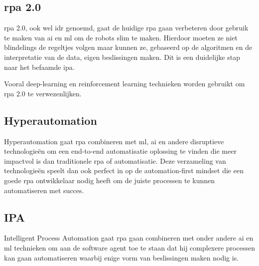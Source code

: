 \subsection{\acrshort{rpa} 2.0}
\acrshort{rpa} 2.0, ook wel \acrfull{idr} genoemd, gaat de huidige \acrshort{rpa} gaan verbeteren door gebruik te maken van  \acrshort{ai} en  \acrshort{ml} om de robots slim te maken. Hierdoor moeten ze niet blindelings de regeltjes volgen maar kunnen ze, gebaseerd op de algoritmen en de interpretatie van de data, eigen beslissingen maken. Dit is een duidelijke stap naar het befaamde  \acrshort{ipa}. \autocite{idrRPA}

Vooral deep-learning en reinforcement learning technieken worden gebruikt om \acrshort{rpa} 2.0 te verwezenlijken. \autocite{idrRPA}

\subsection{Hyperautomation}
Hyperautomation gaat \acrshort{rpa} combineren met  \acrshort{ml},  \acrshort{ai} en andere disruptieve technologieën om een end-to-end automatisatie oplossing te vinden die meer impactvol is dan traditionele \acrshort{rpa} of automatisatie. Deze verzameling van technologieën speelt dan ook perfect in op de automation-first mindset die een goede \acrshort{rpa} ontwikkelaar nodig heeft om de juiste processen te kunnen automatiseren met succes. \autocite{hyperautomation}

\subsection{IPA}
Intelligent Process Automation gaat \acrshort{rpa} gaan combineren met onder andere  \acrshort{ai} en  \acrshort{ml} technieken om aan de software agent toe te staan dat hij complexere processen kan gaan automatiseren waarbij enige vorm van beslissingen maken nodig is.

